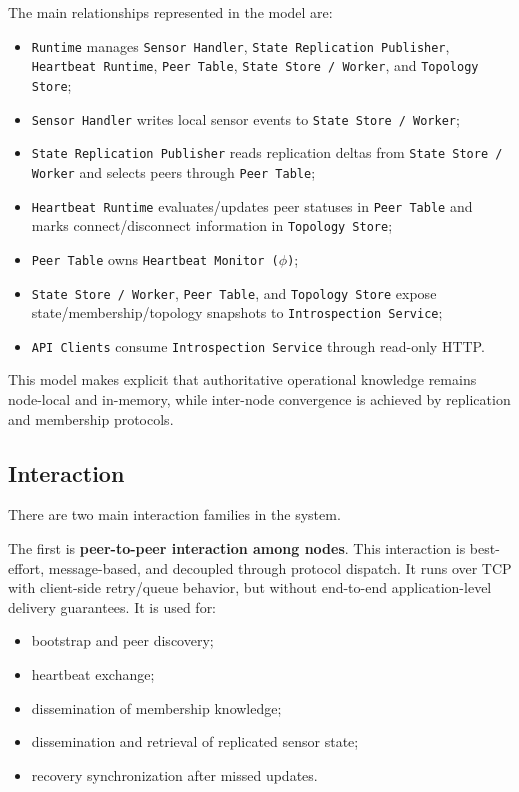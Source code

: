 The main relationships represented in the model are:
\begin{itemize}
  \item \texttt{Runtime} manages \texttt{Sensor Handler}, \texttt{State Replication Publisher}, \texttt{Heartbeat Runtime}, \texttt{Peer Table}, \texttt{State Store / Worker}, and \texttt{Topology Store};
  \item \texttt{Sensor Handler} writes local sensor events to \texttt{State Store / Worker};
  \item \texttt{State Replication Publisher} reads replication deltas from \texttt{State Store / Worker} and selects peers through \texttt{Peer Table};
  \item \texttt{Heartbeat Runtime} evaluates/updates peer statuses in \texttt{Peer Table} and marks connect/disconnect information in \texttt{Topology Store};
  \item \texttt{Peer Table} owns \texttt{Heartbeat Monitor (\(\phi\))};
  \item \texttt{State Store / Worker}, \texttt{Peer Table}, and \texttt{Topology Store} expose state/membership/topology snapshots to \texttt{Introspection Service};
  \item \texttt{API Clients} consume \texttt{Introspection Service} through read-only HTTP.
\end{itemize}

This model makes explicit that authoritative operational knowledge remains node-local and in-memory, while inter-node convergence is achieved by replication and membership protocols.


\subsection{Interaction}\label{interaction}

There are two main interaction families in the system.

The first is \textbf{peer-to-peer interaction among nodes}. This interaction is best-effort, message-based, and decoupled through protocol dispatch. It runs over TCP with client-side retry/queue behavior, but without end-to-end application-level delivery guarantees. It is used for:
\begin{itemize}
  \item bootstrap and peer discovery;
  \item heartbeat exchange;
  \item dissemination of membership knowledge;
  \item dissemination and retrieval of replicated sensor state;
  \item recovery synchronization after missed updates.
\end{itemize}

